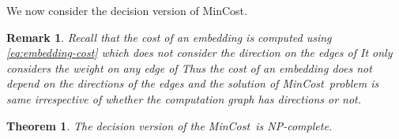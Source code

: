 \documentclass[journal]{IEEEtran}
\newtheorem{theorem}{{\bf Theorem}}
\newtheorem{remark}{{\bf Remark}}
\newcommand{\mincost}{\textsf{MinCost}}
\begin{document}
We now consider the decision version of \mincost.

\begin{remark}
  \label{rm:directed}
  Recall that the cost of an embedding  is computed using
  \eqref{eq:embedding-cost} which does not consider the direction on
  the edges of  It only considers the weight  on
  any edge of  Thus the cost of an embedding does not
  depend on the directions of the edges and the solution of \mincost\
  problem is same irrespective of whether the computation graph
   has directions or not.
\end{remark}

\begin{theorem}
  \label{thm:mincost}
  The decision version of the \mincost\ is NP-complete.
\end{theorem}
\end{document}
